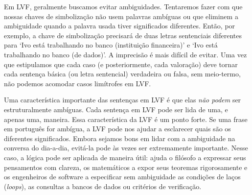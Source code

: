 Em LVF, geralmente buscamos evitar ambiguidades. Tentaremos fazer com que nossas chaves de simbolização não usem palavras ambíguas ou que eliminem a ambiguidade quando a palavra usada tiver significados diferentes. Então, por exemplo, a chave de simbolização precisará de duas letras sentenciais diferentes para `Ivo está trabalhando no banco (instituição financeira)' e `Ivo está trabalhando no banco (de dados)'. A imprecisão é mais difícil de evitar. Uma vez que estipulamos que cada caso (e posteriormente, cada valoração) deve tornar cada sentença básica (ou letra sentencial) verdadeira ou falsa, sem meio-termo, não podemos acomodar casos limítrofes em LVF. 

Uma característica importante das sentenças em LVF é que elas \emph{não podem} ser estruturalmente ambíguas. Cada sentença em LVF pode ser lida de uma, e apenas uma, maneira. Essa característica da LVF é um ponto forte. Se uma frase em português for ambígua, a LVF pode nos ajudar a esclarecer quais são os diferentes significados. Embora sejamos bons em lidar com a ambiguidade na conversa do dia-a-dia, evitá-la pode às vezes ser extremamente importante. Nesse caso, a lógica pode ser aplicada de maneira útil: ajuda o filósofo a expressar seus pensamentos com clareza, os matemáticos a expor seus teoremas rigorosamente e os engenheiros de software a especificar sem ambiguidade as condições de laços (\textit{loops}), as consultas a bancos de dados ou critérios de verificação. 


